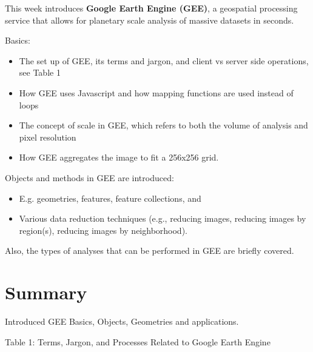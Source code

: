\documentclass[
  letterpaper,
  DIV=11,
  numbers=noendperiod]{scrreprt}
\providecommand{\tightlist}{%
  \setlength{\itemsep}{0pt}\setlength{\parskip}{0pt}}\usepackage{longtable,booktabs,array}
\begin{document}
This week introduces \textbf{Google Earth Engine (GEE)}, a geospatial
processing service that allows for planetary scale analysis of massive
datasets in seconds.

Basics:

\begin{itemize}
\tightlist
\item
  The set up of GEE, its terms and jargon, and client vs server side
  operations, see Table 1
\item
  How GEE uses Javascript and how mapping functions are used instead of
  loops
\item
  The concept of scale in GEE, which refers to both the volume of
  analysis and pixel resolution
\item
  How GEE aggregates the image to fit a 256x256 grid.
\end{itemize}

Objects and methods in GEE are introduced:

\begin{itemize}
\tightlist
\item
  E.g. geometries, features, feature collections, and
\item
  Various data reduction techniques (e.g., reducing images, reducing
  images by region(s), reducing images by neighborhood).
\end{itemize}

Also, the types of analyses that can be performed in GEE are briefly
covered.

\hypertarget{summary-3}{%
\section{Summary}\label{summary-3}}

Introduced GEE Basics, Objects, Geometries and applications.

Table 1: Terms, Jargon, and Processes Related to Google Earth Engine
\end{document}

